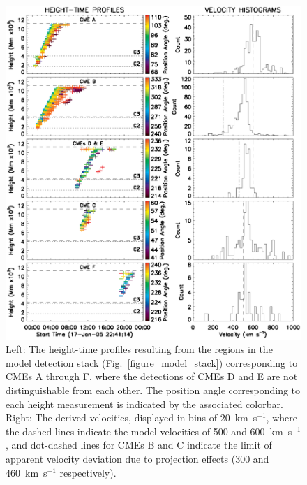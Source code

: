 \documentclass[preprint2]{aastex}
\begin{document}
\begin{figure}[!t]
\centerline{\includegraphics[scale=0.85, clip=true, trim=0 0 0 0]{figure_model_histograms.eps}}
\caption{Left: The height-time profiles resulting from the regions in the model detection stack (Fig.~\ref{figure_model_stack}) corresponding to CMEs A through F, where the detections of CMEs D and E are not distinguishable from each other. The position angle corresponding to each height measurement is indicated by the associated colorbar. Right: The derived velocities, displayed in bins of 20~km~s$^{-1}$, where the dashed lines indicate the model velocities of 500 and 600~km~s$^{-1}$, and dot-dashed lines for CMEs B and C indicate the limit of apparent velocity deviation due to projection effects (300 and 460~km~s$^{-1}$ respectively).}
\label{figure_model_histograms_colour}
\end{figure}
\end{document}
